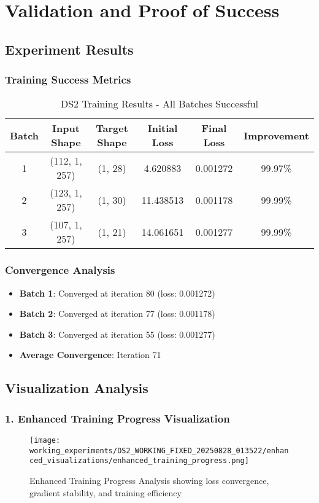 \documentclass[11pt,a4paper]{article}
\begin{document}
\section{Validation and Proof of Success}

\subsection{Experiment Results}

\subsubsection{Training Success Metrics}
\begin{table}[H]
\centering
\caption{DS2 Training Results - All Batches Successful}
\begin{tabular}{|c|c|c|c|c|c|}
\hline
\textbf{Batch} & \textbf{Input Shape} & \textbf{Target Shape} & \textbf{Initial Loss} & \textbf{Final Loss} & \textbf{Improvement} \\
\hline
1 & (112, 1, 257) & (1, 28) & 4.620883 & 0.001272 & 99.97\% \\
\hline
2 & (123, 1, 257) & (1, 30) & 11.438513 & 0.001178 & 99.99\% \\
\hline
3 & (107, 1, 257) & (1, 21) & 14.061651 & 0.001277 & 99.99\% \\
\hline
\end{tabular}
\end{table}

\subsubsection{Convergence Analysis}
\begin{itemize}
    \item \textbf{Batch 1}: Converged at iteration 80 (loss: 0.001272)
    \item \textbf{Batch 2}: Converged at iteration 77 (loss: 0.001178)
    \item \textbf{Batch 3}: Converged at iteration 55 (loss: 0.001277)
    \item \textbf{Average Convergence}: Iteration 71
\end{itemize}

\subsection{Visualization Analysis}

\subsubsection{1. Enhanced Training Progress Visualization}
\begin{figure}[H]
\centering
\texttt{[image: working\_experiments/DS2\_WORKING\_FIXED\_20250828\_013522/enhanced\_visualizations/enhanced\_training\_progress.png]}
\caption{Enhanced Training Progress Analysis showing loss convergence, gradient stability, and training efficiency}
\label{fig:enhanced_training}
\end{figure}
\end{document}
